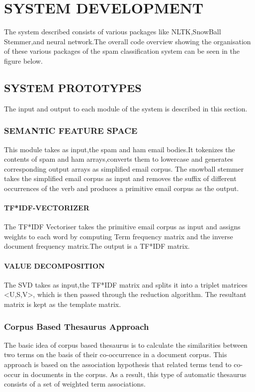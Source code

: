 
\chapter{SYSTEM DEVELOPMENT} %


The system described consists of various packages like NLTK,SnowBall Stemmer,and neural network.The overall code overview showing the 
organisation of these various packages of the spam classification system can be seen in the figure below.


\section{SYSTEM PROTOTYPES}

The input and output to each module of the system is described in
this section.

\subsection{SEMANTIC FEATURE SPACE}
This module takes as input,the spam and ham email bodies.It tokenizes the contents of spam and ham arrays,converts them to lowercase and generates corresponding output arrays as simplified email corpus. The snowball stemmer takes the simplified email corpus as input and removes the suffix of different occurrences of the verb and produces a primitive email corpus as the output.


\subsubsection{TF*IDF-VECTORIZER}  
The TF*IDF Vectoriser takes the primitive email corpus as input and assigns weights to each word by computing Term frequency matrix and the inverse document frequency matrix.The output is a TF*IDF matrix.
\subsubsection{VALUE DECOMPOSITION}
The SVD takes as input,the TF*IDF matrix and splits it into a triplet matrices <U,S,V>, which is then passed through the reduction algorithm. The resultant matrix is kept as the template matrix. 

\subsection{Corpus Based Thesaurus Approach}
The basic idea of corpus based thesaurus is to calculate the similarities between two terms on the basis of their co-occurrence in a document corpus. This approach is based on the association hypothesis that related terms tend to co-occur in documents in the corpus. As a result, this type of automatic thesaurus consists of a set of weighted term associations. 


